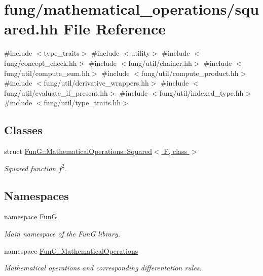 \hypertarget{squared_8hh}{\section{fung/mathematical\-\_\-operations/squared.hh \-File \-Reference}
\label{squared_8hh}
}
{\ttfamily \#include $<$type\-\_\-traits$>$}\*
{\ttfamily \#include $<$utility$>$}\*
{\ttfamily \#include $<$fung/concept\-\_\-check.\-hh$>$}\*
{\ttfamily \#include $<$fung/util/chainer.\-hh$>$}\*
{\ttfamily \#include $<$fung/util/compute\-\_\-sum.\-hh$>$}\*
{\ttfamily \#include $<$fung/util/compute\-\_\-product.\-hh$>$}\*
{\ttfamily \#include $<$fung/util/derivative\-\_\-wrappers.\-hh$>$}\*
{\ttfamily \#include $<$fung/util/evaluate\-\_\-if\-\_\-present.\-hh$>$}\*
{\ttfamily \#include $<$fung/util/indexed\-\_\-type.\-hh$>$}\*
{\ttfamily \#include $<$fung/util/type\-\_\-traits.\-hh$>$}\*
\subsection*{\-Classes}
\begin{DoxyCompactItemize}
\item 
struct \hyperlink{structFunG_1_1MathematicalOperations_1_1Squared}{\-Fun\-G\-::\-Mathematical\-Operations\-::\-Squared$<$ F, class $>$}
\begin{DoxyCompactList}\small\item\em \-Squared function $f^2$. \end{DoxyCompactList}\end{DoxyCompactItemize}
\subsection*{\-Namespaces}
\begin{DoxyCompactItemize}
\item 
namespace \hyperlink{namespaceFunG}{\-Fun\-G}
\begin{DoxyCompactList}\small\item\em \-Main namespace of the \-Fun\-G library. \end{DoxyCompactList}\item 
namespace \hyperlink{namespaceFunG_1_1MathematicalOperations}{\-Fun\-G\-::\-Mathematical\-Operations}
\begin{DoxyCompactList}\small\item\em \-Mathematical operations and corresponding differentation rules. \end{DoxyCompactList}\end{DoxyCompactItemize}
